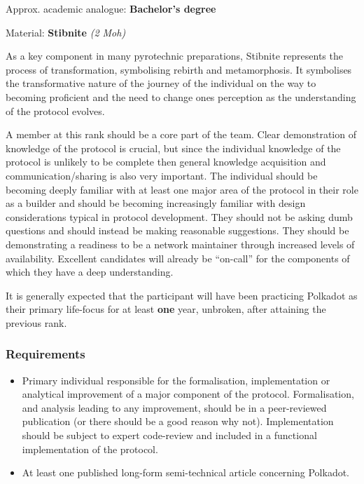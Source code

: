 \documentclass[9pt,oneside]{amsart}
\begin{document}

Approx. academic analogue: \textbf{Bachelor's degree}

Material: \textbf{Stibnite} \emph{(2 Moh)}

As a key component in many pyrotechnic preparations, Stibnite represents the process of transformation, symbolising rebirth and metamorphosis. It symbolises the transformative nature of the journey of the individual on the way to becoming proficient and the need to change ones perception as the understanding of the protocol evolves.

A member at this rank should be a core part of the team. Clear demonstration of knowledge of the protocol is crucial, but since the individual knowledge of the protocol is unlikely to be complete then general knowledge acquisition and communication/sharing is also very important. The individual should be becoming deeply familiar with at least one major area of the protocol in their role as a builder and should be becoming increasingly familiar with design considerations typical in protocol development. They should not be asking dumb questions and should instead be making reasonable suggestions. They should be demonstrating a readiness to be a network maintainer through increased levels of availability. Excellent candidates will already be ``on-call'' for the components of which they have a deep understanding.

It is generally expected that the participant will have been practicing Polkadot as their primary life-focus for at least \textbf{one} year, unbroken, after attaining the previous rank.

\subsubsection{Requirements}\label{requirements-2}

\begin{itemize}
\item Primary individual responsible for the formalisation, implementation or analytical improvement of a major component of the protocol. Formalisation, and analysis leading to any improvement, should be in a peer-reviewed publication (or there should be a good reason why not). Implementation should be subject to expert code-review and included in a functional implementation of the protocol.
\item At least one published long-form semi-technical article concerning Polkadot.
\end{itemize}
\end{document}

